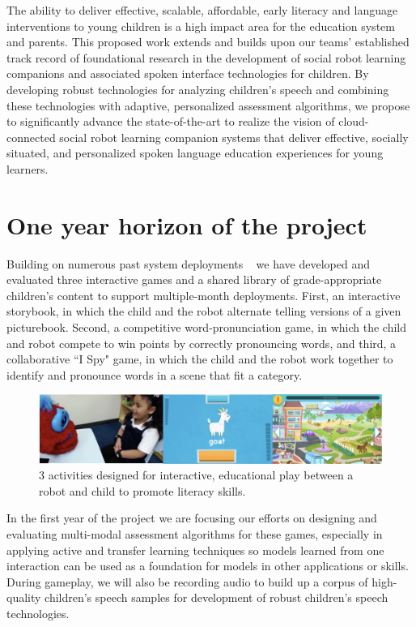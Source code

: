 The ability to deliver effective, scalable, affordable, early literacy and language interventions to young children is a high impact area for the education system and parents. This proposed work extends and builds upon our teams' established track record of foundational research in the development of social robot learning companions and associated spoken interface technologies for children. By developing robust technologies for analyzing children's speech and combining these technologies with adaptive, personalized assessment algorithms, we propose to significantly advance the state-of-the-art to realize the vision of cloud-connected social robot learning companion systems that deliver effective, socially situated, and personalized spoken language education experiences for young learners.
\vspace{-4mm}   

\section{One year horizon of the project}
\vspace{-3mm}   
Building on numerous past system deployments ~\cite{park2017hri-bc, gordon2016affective, westlund2017flat} we have developed and evaluated three interactive games and a shared library of grade-appropriate children's content to support multiple-month deployments. First, an interactive storybook, in which the child and the robot alternate telling versions of a given picturebook. Second, a competitive word-pronunciation game, in which the child and robot compete to win points by correctly pronouncing words, and third, a collaborative ``I Spy" game, in which the child and the robot work together to identify and pronounce words in a scene that fit a category.

\begin{figure}%
  \centering
  \includegraphics[width=.85\textwidth]{fig/game_screens.png}  
  \caption{3 activities designed for interactive, educational play between a robot and child to promote literacy skills.}
  \vspace{-4mm} 
  \label{fig:robots}
\end{figure}
In the first year of the project we are focusing our efforts on designing and evaluating multi-modal assessment algorithms for these games, especially in applying active and transfer learning techniques so models learned from one interaction can be used as a foundation for models in other applications or skills. During gameplay, we will also be recording audio to build up a corpus of high-quality children's speech samples for development of robust children's speech technologies.


